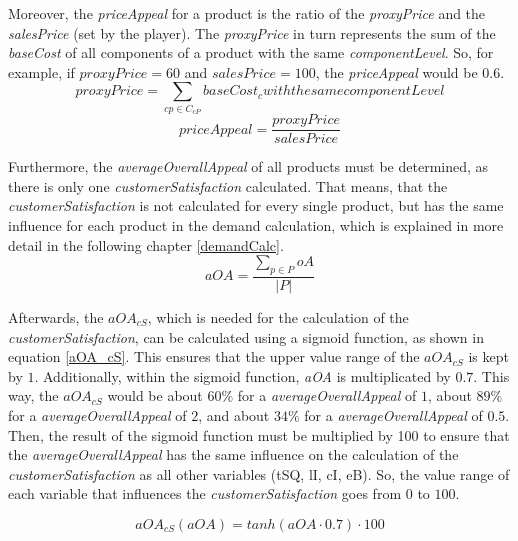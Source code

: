Moreover, the \textit{priceAppeal} for a product is the ratio of the \textit{proxyPrice} and the \textit{salesPrice} (set by the player). The \textit{proxyPrice} in turn represents the sum of the \textit{baseCost} of all components of a product with the same \textit{componentLevel}. So, for example, if $proxyPrice = 60$ and $salesPrice = 100$, the \textit{priceAppeal} would be $0.6$.
\begin{equation}
    proxyPrice = \sum_{cp \in C_{cP}} baseCost_{c} with the same componentLevel
\end{equation}
\begin{equation}
    priceAppeal = \dfrac{proxyPrice}{salesPrice}
\end{equation}

Furthermore, the \textit{averageOverallAppeal} of all products must be determined, as there is only one \textit{customerSatisfaction} calculated. That means, that the \textit{customerSatisfaction} is not calculated for every single product, but has the same influence for each product in the demand calculation, which is explained in more detail in the following chapter \ref{demandCalc}.
\begin{equation}
    aOA = \frac{\sum_{p \in P} oA}{|P|}
\end{equation}

Afterwards, the $aOA_{cS}$, which is needed for the calculation of the \textit{customerSatisfaction}, can be calculated using a sigmoid function, as shown in equation \ref{aOA_cS}. This ensures that the upper value range of the $aOA_{cS}$ is kept by $1$.
Additionally, within the sigmoid function, \textit{aOA} is multiplicated by $0.7$. This way, the $aOA_{cS}$ would be about $60\%$ for a \textit{averageOverallAppeal} of $1$, about $89\%$ for a \textit{averageOverallAppeal} of $2$, and about $34\%$ for a \textit{averageOverallAppeal} of $0.5$.
Then, the result of the sigmoid function must be multiplied by 100 to ensure that the \textit{averageOverallAppeal} has the same influence on the calculation of the \textit{customerSatisfaction} as all other variables (tSQ, lI, cI, eB). So, the value range of each variable that influences the \textit{customerSatisfaction} goes from $0$ to $100$.

\begin{equation}
\label{aOA_cS}
   aOA_{cS}(aOA) = tanh(aOA \cdot 0.7) \cdot 100
\end{equation}

